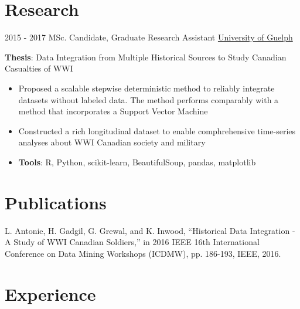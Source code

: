\documentclass[letterpaper]{twentysecondcv} %
\begin{document}
\section{Research}
\begin{twenty}
	\twentyitem
    	{2015 - 2017}
		{}
        {MSc. Candidate, Graduate Research Assistant}
        {\href{http://www.uoguelph.ca/}{University of Guelph}}
        {}
        {
       	\textbf{Thesis}: Data Integration from Multiple Historical Sources to Study Canadian Casualties of WWI
        {\begin{itemize}
        \item Proposed a scalable stepwise deterministic method to reliably integrate datasets without labeled data. The method performs comparably with a method that incorporates a Support Vector Machine
        \item Constructed a rich longitudinal dataset to enable comphrehensive time-series analyses about WWI Canadian society and military
        \item \textbf{Tools}: R, Python, scikit-learn, BeautifulSoup, pandas, matplotlib \vspace{2mm}
		\end{itemize}}
        }
\end{twenty}

\section{Publications}
L. Antonie, H. Gadgil, G. Grewal, and K. Inwood, “Historical Data Integration - A Study of WWI Canadian Soldiers,” in 2016 IEEE 16th International Conference on Data Mining Workshops (ICDMW), pp. 186-193, IEEE, 2016. \vspace{2mm}


\section{Experience}
\end{document}
